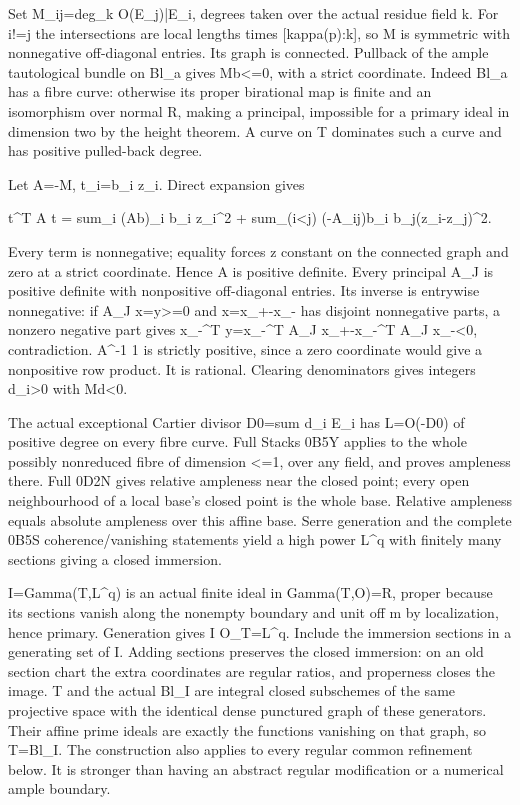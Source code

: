 \documentclass[11pt]{article}
\begin{document}
Set M\_ij=deg\_k O(E\_j)|E\_i, degrees taken over the actual residue field k. For i!=j the intersections are local lengths times [kappa(p):k], so M is symmetric with nonnegative off-diagonal entries. Its graph is connected. Pullback of the ample tautological bundle on Bl\_a gives Mb<=0, with a strict coordinate. Indeed Bl\_a has a fibre curve: otherwise its proper birational map is finite and an isomorphism over normal R, making a principal, impossible for a primary ideal in dimension two by the height theorem. A curve on T dominates such a curve and has positive pulled-back degree.

Let A=-M, t\_i=b\_i z\_i. Direct expansion gives

t\textasciicircum{}T A t = sum\_i (Ab)\_i b\_i z\_i\textasciicircum{}2 + sum\_(i<j) (-A\_ij)b\_i b\_j(z\_i-z\_j)\textasciicircum{}2.

Every term is nonnegative; equality forces z constant on the connected graph and zero at a strict coordinate. Hence A is positive definite. Every principal A\_J is positive definite with nonpositive off-diagonal entries. Its inverse is entrywise nonnegative: if A\_J x=y>=0 and x=x\_+-x\_- has disjoint nonnegative parts, a nonzero negative part gives x\_-\textasciicircum{}T y=x\_-\textasciicircum{}T A\_J x\_+-x\_-\textasciicircum{}T A\_J x\_-<0, contradiction. A\textasciicircum{}-1 1 is strictly positive, since a zero coordinate would give a nonpositive row product. It is rational. Clearing denominators gives integers d\_i>0 with Md<0.

The actual exceptional Cartier divisor D0=sum d\_i E\_i has L=O(-D0) of positive degree on every fibre curve. Full Stacks 0B5Y applies to the whole possibly nonreduced fibre of dimension <=1, over any field, and proves ampleness there. Full 0D2N gives relative ampleness near the closed point; every open neighbourhood of a local base's closed point is the whole base. Relative ampleness equals absolute ampleness over this affine base. Serre generation and the complete 0B5S coherence/vanishing statements yield a high power L\textasciicircum{}q with finitely many sections giving a closed immersion.

I=Gamma(T,L\textasciicircum{}q) is an actual finite ideal in Gamma(T,O)=R, proper because its sections vanish along the nonempty boundary and unit off m by localization, hence primary. Generation gives I O\_T=L\textasciicircum{}q. Include the immersion sections in a generating set of I. Adding sections preserves the closed immersion: on an old section chart the extra coordinates are regular ratios, and properness closes the image. T and the actual Bl\_I are integral closed subschemes of the same projective space with the identical dense punctured graph of these generators. Their affine prime ideals are exactly the functions vanishing on that graph, so T=Bl\_I. The construction also applies to every regular common refinement below. It is stronger than having an abstract regular modification or a numerical ample boundary.
\end{document}
